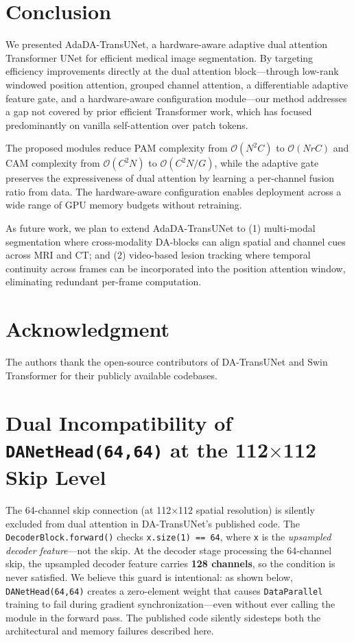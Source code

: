 \documentclass[conference]{IEEEtran}
\begin{document}
\section{Conclusion}

We presented AdaDA-TransUNet, a hardware-aware adaptive dual attention Transformer UNet for efficient medical image segmentation. By targeting efficiency improvements directly at the dual attention block---through low-rank windowed position attention, grouped channel attention, a differentiable adaptive feature gate, and a hardware-aware configuration module---our method addresses a gap not covered by prior efficient Transformer work, which has focused predominantly on vanilla self-attention over patch tokens.

The proposed modules reduce PAM complexity from $\mathcal{O}(N^2 C)$ to $\mathcal{O}(NrC)$ and CAM complexity from $\mathcal{O}(C^2 N)$ to $\mathcal{O}(C^2 N / G)$, while the adaptive gate preserves the expressiveness of dual attention by learning a per-channel fusion ratio from data. The hardware-aware configuration enables deployment across a wide range of GPU memory budgets without retraining.

As future work, we plan to extend AdaDA-TransUNet to (1) multi-modal segmentation where cross-modality DA-blocks can align spatial and channel cues across MRI and CT; and (2) video-based lesion tracking where temporal continuity across frames can be incorporated into the position attention window, eliminating redundant per-frame computation.

\section*{Acknowledgment}

The authors thank the open-source contributors of DA-TransUNet and Swin Transformer for their publicly available codebases.


\appendix

\section{Dual Incompatibility of \texttt{DANetHead(64,64)} at the 112$\times$112 Skip Level}
\label{app:incompatibility}

The 64-channel skip connection (at 112$\times$112 spatial resolution) is silently excluded from dual attention in DA-TransUNet's published code. The \texttt{DecoderBlock.forward()} checks \texttt{x.size(1) == 64}, where \texttt{x} is the \emph{upsampled decoder feature}---not the skip. At the decoder stage processing the 64-channel skip, the upsampled decoder feature carries \textbf{128 channels}, so the condition is never satisfied. We believe this guard is intentional: as shown below, \texttt{DANetHead(64,64)} creates a zero-element weight that causes \texttt{DataParallel} training to fail during gradient synchronization---even without ever calling the module in the forward pass. The published code silently sidesteps both the architectural and memory failures described here.
\end{document}
